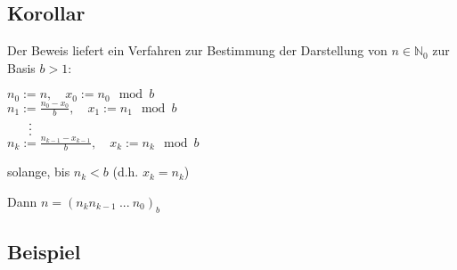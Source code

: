 \documentclass[a4paper, 12pt, twoside] {article}
\begin{document}
\subsection{Korollar} 

Der Beweis liefert ein Verfahren zur Bestimmung der Darstellung von $n \in \mathbb{N}_0$ zur Basis $b > 1$:

$n_0 := n, \quad x_0 := n_0 \mod b$ \\
$n_1 := \frac{n_0-x_0}{b}, \quad x_1 := n_1 \mod b$ \\
$\text{\quad}\ \ \vdots$ \\
$n_k := \frac{n_{k-1}-x_{k-1}}{b}, \quad x_k := n_k \mod b$

solange, bis $n_k < b$ (d.h. $x_k=n_k$)

Dann $n = (n_k n_{k-1} \ ... \ n_0)_b$

\subsection{Beispiel}
\end{document}
